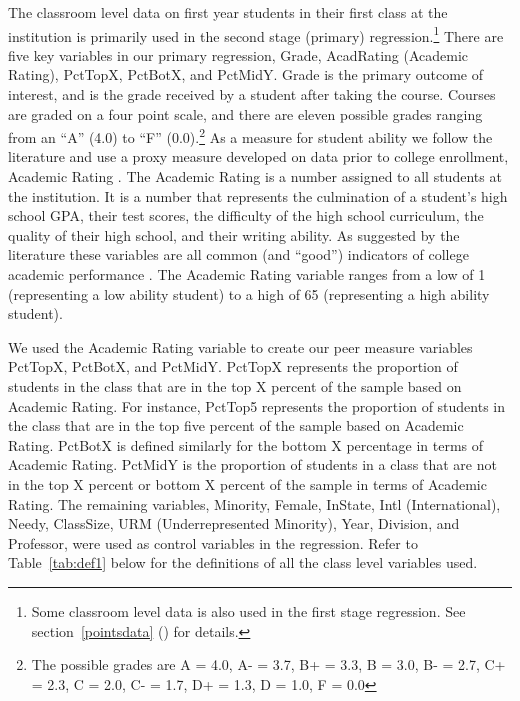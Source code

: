 \documentclass[12pt,a4paper,english,fleqn]{article}
\newcommand{\sectlabel}[1]{section~\ref{#1} (\nameref{#1})}
\newcommand{\tablelabel}[1]{Table~\ref{#1}}
\begin{document}
The classroom level data on first year students in their first class at the institution is primarily used in the second stage (primary) regression.\footnote{Some classroom level data is also used in the first stage regression. See \sectlabel{pointsdata} for details.}
There are five key variables in our primary regression, Grade, AcadRating (Academic Rating), PctTopX, PctBotX, and PctMidY. 
Grade is the primary outcome of interest, and is the grade received by a student after taking the course. 
Courses are graded on a four point scale, and there are eleven possible grades ranging from an ``A'' (4.0) to ``F'' (0.0).\footnote{The possible grades are A = 4.0, A- = 3.7, B+ = 3.3, B = 3.0, B- = 2.7, C+ = 2.3, C = 2.0, C- = 1.7, D+ = 1.3, D = 1.0, F = 0.0} 
As a measure for student ability we follow the literature and use a proxy measure developed on data prior to college enrollment, Academic Rating \citep{griffith2014peer}. 
The Academic Rating is a number assigned to all students at the institution. 
It is a number that represents the culmination of a student's high school GPA, their test scores, the difficulty of the high school curriculum, the quality of their high school, and their writing ability. 
As suggested by the literature these variables are all common (and ``good'') indicators of college academic performance \citep{betts2003determinants,dooley2012persistence}.
The Academic Rating variable ranges from a low of 1 (representing a low ability student) to a high of 65 (representing a high ability student).

We used the Academic Rating variable to create our peer measure variables PctTopX, PctBotX, and PctMidY. 
PctTopX represents the proportion of students in the class that are in the top X percent of the sample based on Academic Rating. 
For instance, PctTop5 represents the proportion of students in the class that are in the top five percent of the sample based on Academic Rating.
PctBotX is defined similarly for the bottom X percentage in terms of Academic Rating. 
PctMidY is the proportion of students in a class that are not in the top X percent or bottom X percent of the sample in terms of Academic Rating. 
The remaining variables, Minority, Female, InState, Intl (International), Needy, ClassSize, URM (Underrepresented Minority), Year, Division, and Professor, were used as control variables in the regression.
Refer to \tablelabel{tab:def1} below for the definitions of all the class level variables used. 

\clearpage{}
\end{document}
